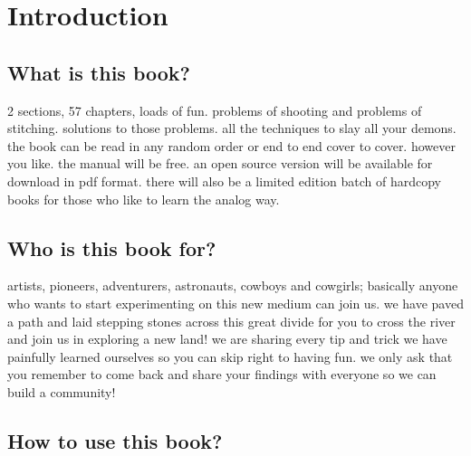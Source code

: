 \chapter{Introduction}

\section{What is this book?}
\begin{fullwidth}

2 sections, 57 chapters, loads of fun.
problems of shooting and problems of stitching.
solutions to those problems.
all the techniques to slay all your demons.
the book can be read in any random order or end to end cover to cover.
however you like.
the manual will be free. an open source version will be available for download in pdf format. there will also be a limited edition batch of hardcopy books for those who like to learn the analog way.

\end{fullwidth}


\section{Who is this book for?}
\begin{fullwidth}

artists, pioneers, adventurers, astronauts, cowboys and cowgirls; basically anyone who wants to start experimenting on this new medium can join us. we have paved a path and laid stepping stones across this great divide for you to cross the river and join us in exploring a new land! we are sharing every tip and trick we have painfully learned ourselves so you can skip right to having fun. we only ask that you remember to come back and share your findings with everyone so we can build a community!

\end{fullwidth}

\section{How to use this book?}
\begin{fullwidth}
\end{fullwidth}

